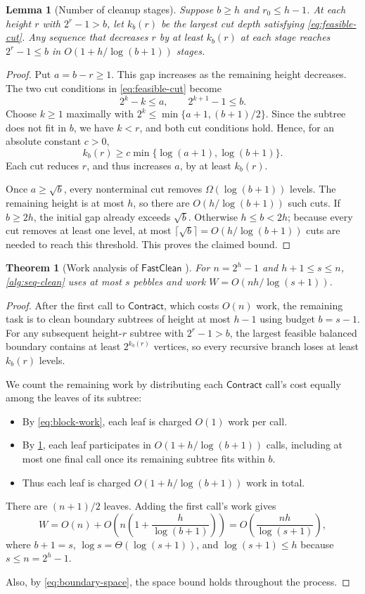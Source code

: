 \documentclass[11pt]{article}
\newtheorem{theorem}{Theorem}[section]
\newtheorem{lemma}[lemma]{Lemma}
\theoremstyle{definition}
\theoremstyle{remark}
\newcommand{\Clean}{\mathsf{FastClean}}
\newcommand{\Contract}{\mathsf{Contract}}
\begin{document}
\begin{lemma}[Number of cleanup stages]
\label{lem:slack}
Suppose $b\ge h$ and $r_0\le h-1$. At each height $r$ with $2^r-1>b$, let $k_b(r)$ be the largest cut depth satisfying \cref{eq:feasible-cut}. Any sequence that decreases $r$ by at least $k_b(r)$ at each stage reaches $2^r-1\le b$ in $O(1+h/\log(b+1))$ stages.
\end{lemma}
\begin{proof}
Put $a=b-r\ge1$. This gap increases as the remaining height decreases. The two cut conditions in \cref{eq:feasible-cut} become
\[
2^k-k\le a,\qquad 2^{k+1}-1\le b.
\]
Choose $k\ge1$ maximally with $2^k\le\min\{a+1,(b+1)/2\}$. Since the subtree does not fit in $b$, we have $k<r$, and both cut conditions hold. Hence, for an absolute constant $c>0$,
\[
 k_b(r)\ge c\min\{\log(a+1),\log(b+1)\}.
\]
Each cut reduces $r$, and thus increases $a$, by at least $k_b(r)$.

Once $a\ge\sqrt b$, every nonterminal cut removes $\Omega(\log(b+1))$ levels. The remaining height is at most $h$, so there are $O(h/\log(b+1))$ such cuts. If $b\ge2h$, the initial gap already exceeds $\sqrt b$. Otherwise $h\le b<2h$; because every cut removes at least one level, at most $\lceil\sqrt b\rceil=O(h/\log(b+1))$ cuts are needed to reach this threshold. This proves the claimed bound.
\end{proof}

\begin{theorem}[Work analysis of $\Clean$ ]
\label{thm:seq-upper}
For $n=2^h-1$ and $h+1\le s\le n$, \cref{alg:seq-clean} uses at most $s$ pebbles and work $W=O(nh/\log(s+1))$.
\end{theorem}
\begin{proof}

After the first call to $\Contract$, which costs $O(n)$ work, the remaining task is to clean boundary subtrees of height at most $h-1$ using budget $b=s-1$. For any subsequent height-$r$ subtree with $2^r-1>b$, the largest feasible balanced boundary contains at least $2^{k_b(r)}$ vertices, so every recursive branch loses at least $k_b(r)$ levels.

We count the remaining work by distributing each $\Contract$ call's cost equally among the leaves of its subtree:
\begin{itemize}
    \item By \cref{eq:block-work}, each leaf is charged $O(1)$ work per call.
    \item By \cref{lem:slack}, each leaf participates in $O(1+h/\log(b+1))$ calls, including at most one final call once its remaining subtree fits within $b$.
    \item Thus each leaf is charged $O(1+h/\log(b+1))$ work in total.
\end{itemize}
There are $(n+1)/2$ leaves. Adding the first call's work gives
\[
W=O(n)+O\!\left(n\left(1+\frac{h}{\log(b+1)}\right)\right)
 =O\!\left(\frac{nh}{\log(s+1)}\right),
\]
where $b+1=s$, $\log s=\Theta(\log(s+1))$, and $\log(s+1)\le h$ because $s\le n=2^h-1$.

Also, by \cref{eq:boundary-space}, the space bound holds throughout the process.

\end{proof}
\end{document}
